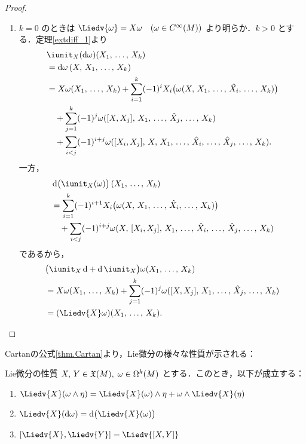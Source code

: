 \documentclass[geometry_main]{subfiles}
\begin{document}
\begin{proof}
\begin{enumerate}
		\item $k=0$ のときは $\Liedv{\omega} = X \omega\quad (\omega \in \cinftyf{M})$ より明らか．$k > 0$ とする．定理\ref{extdiff_1}より
		\begin{align} 
			&\iunit_X(\dd{\omega})(X_1,\, \dots ,\, X_k) \\
			&= \dd{\omega}(X,\, X_1,\, \dots ,\, X_k) \\
			&= X\omega (X_1,\, \dots ,\, X_k) + \sum_{i=1}^{k} (-1)^{i} X_i \bigl( \omega(X,\, X_1,\, \dots ,\, \hat{X_i},\, \dots ,\, X_k) \bigr)  \\
			&\quad + \sum_{j=1}^k (-1)^{j} \omega(\comm{X}{X_j},\, X_1,\, \dots ,\, \hat{X}_j ,\, \dots,\, X_{k}) \\
			&\quad + \sum_{i<j} (-1)^{i+j} \omega(\comm{X_i}{X_j},\, X,\, X_1,\, \dots ,\, \hat{X}_i,\, \dots ,\, \hat{X}_j ,\, \dots ,\, X_k).
		\end{align}
		一方，
		\begin{align} 
			&\dd{ \bigl( \iunit_X (\omega) \bigr) }(X_1,\, \dots ,\, X_k) \\
			&= \sum_{i=1}^k (-1)^{i+1} X_i \bigl( \omega(X,\, X_1,\, \dots ,\, \hat{X}_i ,\,\dots ,\, X_k) \bigr) \\
			&\quad + \sum_{i<j} (-1)^{i+j} \omega(X,\, \comm{X_i}{X_j},\, X_1,\, \dots ,\, \hat{X}_i ,\, \dots ,\, \hat{X}_j,\, \dots ,\, X_k)
		\end{align}
		であるから，
		\begin{align} 
			&\bigl( \iunit_X \dd{} + \dd{} \iunit_X \bigr) \omega (X_1,\, \dots ,\, X_k) \\
			&= X\omega (X_1,\, \dots ,\, X_k) + \sum_{j=1}^k (-1)^{j} \omega(\comm{X}{X_j},\, X_1,\, \dots ,\, \hat{X}_j ,\, \dots,\, X_{k}) \\
			&= (\Liedv{X}\omega)(X_1,\, \dots,\, X_k).
		\end{align}
	\end{enumerate}
\end{proof}

Cartanの公式\ref{thm.Cartan}より，Lie微分の様々な性質が示される：

\begin{mytheo}[label=thm.Lie_1]{Lie微分の性質}
	$X,\, Y \in \mathfrak{X}(M),\; \omega \in \Omega^k(M)$ とする．このとき，以下が成立する：
	\begin{enumerate} 
		\item $\Liedv{X} (\omega \wedge \eta) = \Liedv{X}(\omega) \wedge \eta + \omega \wedge \Liedv{X}(\eta)$
		\item $\Liedv{X}(\dd{\omega}) = \dd{\bigl(\Liedv{X}(\omega)\bigr)}$
		\item $\comm{\Liedv{X}}{\Liedv{Y}} = \Liedv{\comm{X}{Y}}$
	\end{enumerate}
\end{mytheo}
\end{document}
